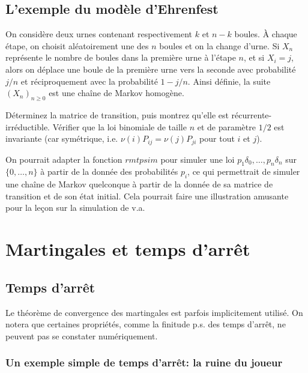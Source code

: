 %
\subsection{L'exemple du modèle d'Ehrenfest}
%

On considère deux urnes contenant respectivement $k$ et $n-k$ boules. À
chaque étape, on choisit aléatoirement une des $n$ boules et on la change
d'urne. Si $X_n$ représente le nombre de boules dans la première urne à
l'étape $n$, et si $X_i=j$, alors on déplace une boule de la première urne
vers la seconde avec probabilité $j/n$ et réciproquement avec la probabilité
$1-j/n$. Ainsi définie, la suite $(X_n)_{n\geq 0}$ est une chaîne de Markov
homogène. 

Déterminez la matrice de transition, puis montrez qu'elle est
récurrente-irréductible. Vérifier que la loi binomiale de taille $n$ et de
paramètre $1/2$ est invariante (car symétrique, i.e. $\nu(i) P_{ij} = \nu(j)
P_{ji}$ pour tout $i$ et $j$). 
%
\begin{exo}
  On pourrait adapter la fonction $rmtpsim$ pour simuler une loi
  $p_1\delta_0,\ldots,p_n\delta_n$ sur $\{0,\ldots,n\}$ à partir de la donnée
  des probabilités $p_i$, ce qui permettrait de simuler une chaîne de Markov
  quelconque à partir de la donnée de sa matrice de transition et de son état
  initial. Cela pourrait faire une illustration amusante pour la leçon sur la
  simulation de v.a.
\end{exo}

%
\section{Martingales et temps d'arrêt}\label{se:martingales}
%

%
\subsection{Temps d'arrêt}
\label{ss:tda}
%

Le théorème de convergence des martingales est parfois implicitement utilisé.
On notera que certaines propriétés, comme la finitude p.s. des temps d'arrêt, 
ne peuvent pas se constater numériquement.

%
\subsubsection{Un exemple simple de temps d'arrêt: la ruine du joueur}
%

